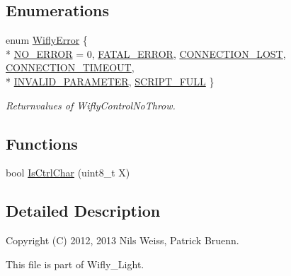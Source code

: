\subsection*{Enumerations}
\begin{DoxyCompactItemize}
\item 
enum \hyperlink{namespace_wy_light_afd625f917b07e9c48f67c4383af5773f}{Wifly\-Error} \{ \\*
\hyperlink{namespace_wy_light_afd625f917b07e9c48f67c4383af5773fa041d99db4a9cc85ed3b2682c3a4530b5}{N\-O\-\_\-\-E\-R\-R\-O\-R} = 0, 
\hyperlink{namespace_wy_light_afd625f917b07e9c48f67c4383af5773fab15784bfc61f7544f4b3bbac1817a793}{F\-A\-T\-A\-L\-\_\-\-E\-R\-R\-O\-R}, 
\hyperlink{namespace_wy_light_afd625f917b07e9c48f67c4383af5773fa507ea1a926f43bf1604d8f83ac2ce8df}{C\-O\-N\-N\-E\-C\-T\-I\-O\-N\-\_\-\-L\-O\-S\-T}, 
\hyperlink{namespace_wy_light_afd625f917b07e9c48f67c4383af5773fa66154513af88023e418086be2c270446}{C\-O\-N\-N\-E\-C\-T\-I\-O\-N\-\_\-\-T\-I\-M\-E\-O\-U\-T}, 
\\*
\hyperlink{namespace_wy_light_afd625f917b07e9c48f67c4383af5773fabafa98a04fa293fffcb58f1547cb0d3e}{I\-N\-V\-A\-L\-I\-D\-\_\-\-P\-A\-R\-A\-M\-E\-T\-E\-R}, 
\hyperlink{namespace_wy_light_afd625f917b07e9c48f67c4383af5773fa8dd025aed3813354c78e26f071501cc6}{S\-C\-R\-I\-P\-T\-\_\-\-F\-U\-L\-L}
 \}
\begin{DoxyCompactList}\small\item\em Returnvalues of Wifly\-Control\-No\-Throw. \end{DoxyCompactList}\end{DoxyCompactItemize}
\subsection*{Functions}
\begin{DoxyCompactItemize}
\item 
bool \hyperlink{namespace_wy_light_a73355ac8e928398a97bc96a90b29f24a}{Is\-Ctrl\-Char} (uint8\-\_\-t X)
\end{DoxyCompactItemize}


\subsection{Detailed Description}
\begin{DoxyVerb}Copyright (C) 2012, 2013 Nils Weiss, Patrick Bruenn.
\end{DoxyVerb}


This file is part of Wifly\-\_\-\-Light.

